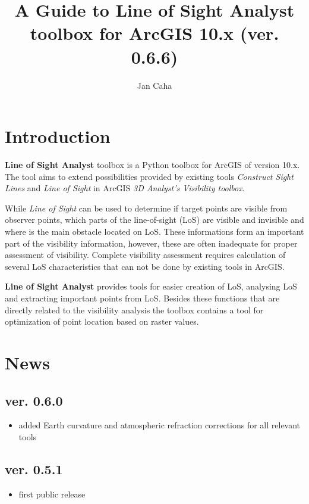 \documentclass[]{article}
\title{A Guide to \textbf{Line of Sight Analyst} toolbox for ArcGIS 10.x (ver. 0.6.6)}
\author[*]{Jan Caha}
\begin{document}
\maketitle

\setcounter{tocdepth}{2}
\tableofcontents

\section{Introduction}

\textbf{Line of Sight Analyst} toolbox is a Python toolbox for ArcGIS of version 10.x. The tool aims to extend possibilities provided by existing tools \textit{Construct Sight Lines} and \textit{Line of Sight} in ArcGIS \textit{3D Analyst's Visibility toolbox}.

While \textit{Line of Sight} can be used to determine if target points are visible from observer points, which parts of the line-of-sight (LoS) are visible and invisible and where is the main obstacle located on LoS. These informations form an important part of the visibility information, however, these are often inadequate for proper assessment of visibility. Complete visibility assessment requires calculation of several LoS characteristics that can not be done by existing tools in ArcGIS.

\textbf{Line of Sight Analyst} provides tools for easier creation of LoS, analysing LoS and extracting important points from LoS. Besides these functions that are directly related to the visibility analysis the toolbox contains a tool for optimization of point location based on raster values.

\section{News}

\subsection*{ver. 0.6.0}
\begin{itemize}
	\item added Earth curvature and atmospheric refraction corrections for all relevant tools
\end{itemize}

\subsection*{ver. 0.5.1}
\begin{itemize}
	\item first public release
\end{itemize}
\end{document}
